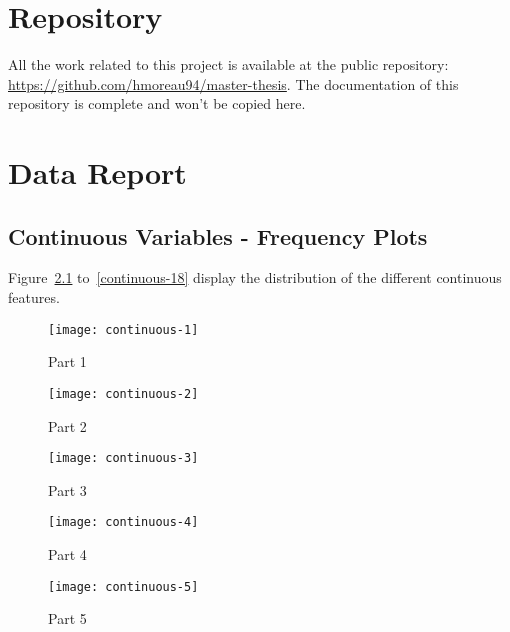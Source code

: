 \cleardoublepage
\appendix
\chapter{Repository}
All the work related to this project is available at the public repository: \url{https://github.com/hmoreau94/master-thesis}. The documentation of this repository is complete and won't be copied here. 


\chapter{Data Report}

\section{Continuous Variables - Frequency Plots}
\label{sec:continuous}
Figure~\ref{continuous-1} to~\ref{continuous-18} display the distribution of the different continuous features. 

\begin{figure}[ht]
    \begin{center}
    \texttt{[image: continuous-1]}
    \end{center}
    \caption{Part 1}
    \label{continuous-1}
\end{figure}

\begin{figure}[ht]
    \begin{center}
    \texttt{[image: continuous-2]}
    \end{center}
    \caption{Part 2}
    \label{continuous-2}
\end{figure}

\begin{figure}[ht]
    \begin{center}
    \texttt{[image: continuous-3]}
    \end{center}
    \caption{Part 3}
    \label{continuous-3}
\end{figure}

\begin{figure}[ht]
    \begin{center}
    \texttt{[image: continuous-4]}
    \end{center}
    \caption{Part 4}
    \label{continuous-4}
\end{figure}

\begin{figure}[ht]
    \begin{center}
    \texttt{[image: continuous-5]}
    \end{center}
    \caption{Part 5}
    \label{continuous-5}
\end{figure}

